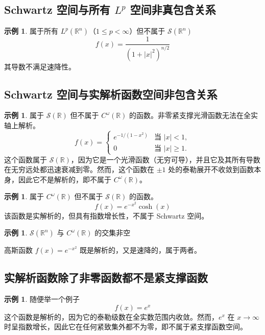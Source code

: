 \documentclass[12pt,a4paper]{article}
\theoremstyle{plain}
\theoremstyle{definition}
\newtheorem{example}[theorem]{示例}
\theoremstyle{remark}
\begin{document}
\subsection{Schwartz 空间与所有 \( L^p \) 空间非真包含关系}
\begin{example}属于所有 \( L^p(\mathbb{R}^n) \)（\(1 \leq p < \infty\)）但不属于 \(\mathcal{S}(\mathbb{R}^n)\)
\[
f(x) = \frac{1}{(1 + |x|^2)^{n/2}}
\]
其导数不满足速降性。
\end{example}

\subsection{Schwartz 空间与实解析函数空间非包含关系}

\begin{example}属于 \(\mathcal{S}(\mathbb{R})\) 但不属于 \(C^\omega(\mathbb{R})\) 的函数。非零紧支撑光滑函数无法在全实轴上解析。
\[
f(x) = \begin{cases} 
	e^{-1/(1 - x^2)} & \text{当 } |x| < 1, \\
	0 & \text{当 } |x| \geq 1.
\end{cases}
\]
这个函数属于 \(\mathcal{S}(\mathbb{R})\)，因为它是一个光滑函数（无穷可导），并且它及其所有导数在无穷远处都迅速衰减到零。然而，这个函数在 \(\pm 1\) 处的泰勒展开不收敛到函数本身，因此它不是解析的，即不属于 \(C^\omega(\mathbb{R})\)。
\end{example}

\begin{example}属于 \(C^\omega(\mathbb{R})\) 但不属于 \(\mathcal{S}(\mathbb{R})\) 的函数。
\[
f(x) = e^{-x^2} \cosh(x)
\]
该函数是实解析的，但具有指数增长性，不属于 Schwartz 空间。

\end{example}


\begin{example}\( \mathcal{S}(\mathbb{R}^n) \) 与 \( C^\omega(\mathbb{R}) \) 的交集非空
	
高斯函数 \( f(x) = e^{-x^2} \) 既是解析的，又是速降的，属于两者。
\end{example}

\subsection{实解析函数除了非零函数都不是紧支撑函数}
\begin{example}随便举一个例子
	\[
	f(x) = e^x
	\]
	这个函数是解析的，因为它的泰勒级数在全实数范围内收敛。然而，\(e^x\) 在 \(x \to \infty\) 时呈指数增长，因此它在任何紧致集外都不为零，即不属于紧支撑函数空间。
\end{example}
\end{document}
